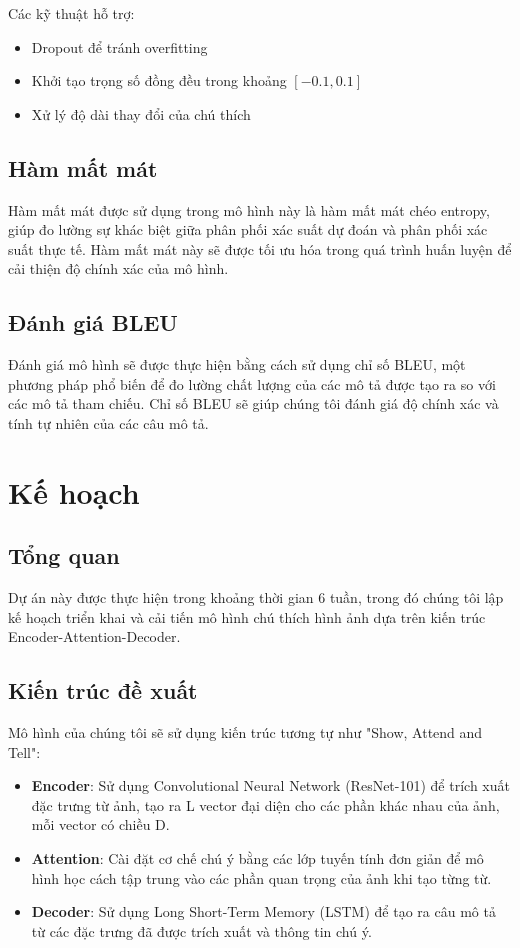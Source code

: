\documentclass[conference]{IEEEtran}
\begin{document}
Các kỹ thuật hỗ trợ:
\begin{itemize}
    \item Dropout để tránh overfitting
    \item Khởi tạo trọng số đồng đều trong khoảng $[-0.1, 0.1]$
    \item Xử lý độ dài thay đổi của chú thích
\end{itemize}
\subsection{Hàm mất mát}
Hàm mất mát được sử dụng trong mô hình này là hàm mất mát chéo entropy, giúp đo lường sự khác biệt giữa phân phối xác suất dự đoán và phân phối xác suất thực tế. Hàm mất mát này sẽ được tối ưu hóa trong quá trình huấn luyện để cải thiện độ chính xác của mô hình.

\subsection{Đánh giá BLEU}

Đánh giá mô hình sẽ được thực hiện bằng cách sử dụng chỉ số BLEU, một phương pháp phổ biến để đo lường chất lượng của các mô tả được tạo ra so với các mô tả tham chiếu. Chỉ số BLEU sẽ giúp chúng tôi đánh giá độ chính xác và tính tự nhiên của các câu mô tả.


\section{Kế hoạch}
\subsection{Tổng quan}
Dự án này được thực hiện trong khoảng thời gian 6 tuần, trong đó chúng tôi lập kế hoạch triển khai và cải tiến mô hình chú thích hình ảnh dựa trên kiến trúc Encoder-Attention-Decoder.
\subsection{Kiến trúc đề xuất}
Mô hình của chúng tôi sẽ sử dụng kiến trúc tương tự như "Show, Attend and Tell":
\begin{itemize}
    \item \textbf{Encoder}: Sử dụng Convolutional Neural Network (ResNet-101) để trích xuất đặc trưng từ ảnh, tạo ra L vector đại diện cho các phần khác nhau của ảnh, mỗi vector có chiều D.
    \item \textbf{Attention}: Cài đặt cơ chế chú ý bằng các lớp tuyến tính đơn giản để mô hình học cách tập trung vào các phần quan trọng của ảnh khi tạo từng từ.
    \item \textbf{Decoder}: Sử dụng Long Short-Term Memory (LSTM) để tạo ra câu mô tả từ các đặc trưng đã được trích xuất và thông tin chú ý.
\end{itemize}
\end{document}
